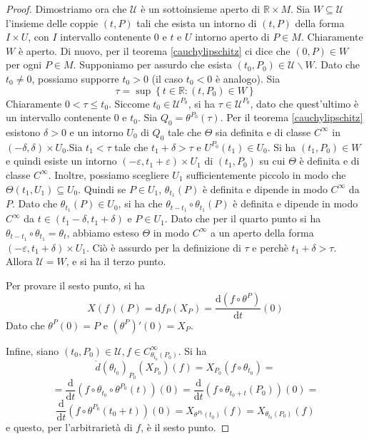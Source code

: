 \documentclass[a4paper,11pt]{article}
\theoremstyle{definition}
\theoremstyle{theorem}
\begin{document}
\begin{proof}
	Dimostriamo ora che $\mathcal{U}$ è un sottoinsieme aperto di $\mathbb{R}\times M$. Sia $W\subseteq\mathcal{U}$ l'insieme delle coppie $(t,P)$ tali che esista un intorno di $(t,P)$ della forma $I\times U$, con $I$ intervallo contenente 0 e $t$ e $U$ intorno aperto di $P\in M$. Chiaramente $W$ è aperto. Di nuovo, per il teorema \ref{cauchylipschitz} ci dice che $(0,P)\in W$ per ogni $P\in M$. Supponiamo per assurdo che esista $(t_0,P_0)\in\mathcal{U}\backslash W$. Dato che $t_0\neq0$, possiamo supporre $t_0>0$ (il caso $t_0<0$ è analogo). Sia
	\[\tau=\sup\left\{t\in\mathbb{R}:(t,P_0)\in W\right\}\]
	Chiaramente $0<\tau\leq t_0$. Siccome $t_0\in\mathcal{U}^{P_0}$, si ha $\tau\in\mathcal{U}^{P_0}$, dato che quest'ultimo è un intervallo contenente 0 e $t_0$. Sia $Q_0=\theta^{P_0}(\tau)$. Per il teorema \ref{cauchylipschitz} esistono $\delta>0$ e un intorno $U_0$ di $Q_0$ tale che $\Theta$ sia definita e di classe $C^\infty$ in $(-\delta,\delta)\times U_0$.Sia $t_1<\tau$ tale che $t_1+\delta>\tau$ e $U^{P_0}(t_1)\in U_0$. Si ha $(t_1,P_0)\in W$ e quindi esiste un intorno $(-\varepsilon,t_1+\varepsilon)\times U_1$ di $(t_1,P_0)$ su cui $\Theta$ è definita e di classe $C^\infty$. Inoltre, possiamo scegliere $U_1$ sufficientemente piccolo in modo che $\Theta(t_1,U_1)\subseteq U_0$. Quindi se $P\in U_1$, $\theta_{t_1}(P)$ è definita e dipende in modo $C^\infty$ da $P$. Dato che $\theta_{t_1}(P)\in U_0$, si ha che $\theta_{t-t_1}\circ\theta_{t_1}(P)$ è definita e dipende in modo $C^\infty$ da $t\in(t_1-\delta,t_1+\delta)$ e $P\in U_1$. Dato che per il quarto punto si ha $\theta_{t-t_1}\circ\theta_{t_1}=\theta_t$, abbiamo esteso $\Theta$ in modo $C^\infty$ a un aperto della forma $(-\varepsilon,t_1+\delta)\times U_1$. Ciò è assurdo per la definizione di $\tau$ e perchè $t_1+\delta>\tau$. Allora $\mathcal{U}=W$, e si ha il terzo punto.
	
	Per provare il sesto punto, si ha
	\[X(f)(P)=\mathrm{d}f_P(X_P)=\frac{\mathrm{d}\left(f\circ\theta^P\right)}{\mathrm{d}t}(0)\]
	Dato che $\theta^P(0)=P$ e $\left(\theta^P\right)'(0)=X_P$.
	
	Infine, siano $(t_0,P_0)\in\mathcal{U},f\in C^\infty_{\theta_{t_0}(P_0)}$. Si ha
	\[\mathring{d}\left(\theta_{t_0}\right)_{P_0}(X_{P_0})(f)=X_{P_0}(f\circ\theta_{t_0})=\]
	\[=\frac{\mathrm{d}}{\mathrm{d}t}\left(f\circ\theta_{t_0}\circ\theta^{P_0}(t)\right)(0)=\frac{\mathrm{d}}{\mathrm{d}t}\left(f\circ\theta_{t_0+t}(P_0)\right)(0)=\]\[\frac{\mathrm{d}}{\mathrm{d}t}\left(f\circ\theta^{P_0}(t_0+t)\right)(0)=X_{\theta^{P_0}(t_0)}(f)=X_{\theta_{t_0}(P_0)}(f)\]
	e questo, per l'arbitrarietà di $f$, è il sesto punto.
\end{proof}
\end{document}
